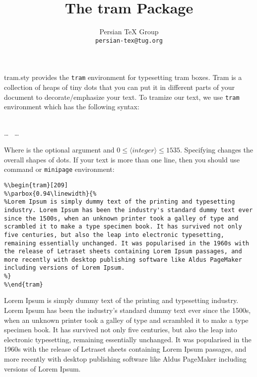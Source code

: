 \documentclass{article}
\title{The \textsf{tram} Package}
\author{Persian TeX Group\\ \texttt{persian-tex@tug.org}}
\begin{document}
\maketitle
\textsf{tram.sty} provides  the \texttt{tram} environment for typesetting tram boxes.  Tram is a collection of heaps of tiny dots that you can put it in different parts of your document to decorate/emphasize your text. To tramize our text, we use \texttt{tram} environment which has the following syntax:
\begin{BDef}
\\
\ldots\  \ldots\\
\end{BDef}
Where  is the optional argument and $0\leq\langle integer\rangle\leq1535$. Specifying  changes the overall shapes of dots.  If your text is more than one line, then  you should use  command or \texttt{minipage} environment:

\bigskip
\begin{lstlisting}
%\begin{tram}[209]
%\parbox{0.94\linewidth}{%
%Lorem Ipsum is simply dummy text of the printing and typesetting industry. Lorem Ipsum has been the industry's standard dummy text ever since the 1500s, when an unknown printer took a galley of type and scrambled it to make a type specimen book. It has survived not only five centuries, but also the leap into electronic typesetting, remaining essentially unchanged. It was popularised in the 1960s with the release of Letraset sheets containing Lorem Ipsum passages, and more recently with desktop publishing software like Aldus PageMaker including versions of Lorem Ipsum.
%}
%\end{tram}
\end{lstlisting}

\bigskip
\begin{tram}[209]
\parbox{0.94\linewidth}{%
Lorem Ipsum is simply dummy text of the printing and typesetting industry. Lorem Ipsum has been the industry's standard dummy text ever since the 1500s, when an unknown printer took a galley of type and scrambled it to make a type specimen book. It has survived not only five centuries, but also the leap into electronic typesetting, remaining essentially unchanged. It was popularised in the 1960s with the release of Letraset sheets containing Lorem Ipsum passages, and more recently with desktop publishing software like Aldus PageMaker including versions of Lorem Ipsum.
}
\end{tram}
\end{document}
